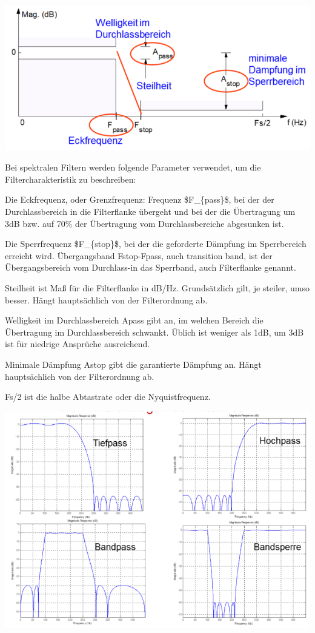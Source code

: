 \documentclass[a4paper]{article}
\begin{document}
\begin{multicols}{3}
  \begin{itemize*}
    \item \includegraphics[width=.5\linewidth]{Assets/Biosignalverarbeitung-Filtertheorie.png}
    \item Bei spektralen Filtern werden folgende Parameter verwendet, um die Filtercharakteristik zu beschreiben:
    \begin{itemize*}
      \item Die Eckfrequenz, oder Grenzfrequenz: Frequenz \$F\_\{pass\}\$, bei der der Durchlassbereich in die Filterflanke übergeht und bei der die Übertragung um 3dB bzw. auf 70\% der Übertragung vom Durchlassbereiche abgesunken ist.
      \item Die Sperrfrequenz \$F\_\{stop\}\$, bei der die geforderte Dämpfung im Sperrbereich erreicht wird. Übergangsband Fstop-Fpass, auch transition band, ist der Übergangsbereich vom Durchlass-in das Sperrband, auch Filterflanke genannt. \item Steilheit ist Maß für die Filterflanke in dB/Hz. Grundsätzlich gilt, je steiler, umso besser. Hängt hauptsächlich von der Filterordnung ab.
      \item Welligkeit im Durchlassbereich Apass gibt an, im welchen Bereich die Übertragung im Durchlassbereich schwankt. Üblich ist weniger als 1dB, um 3dB ist für niedrige Ansprüche ausreichend.
      \item Minimale Dämpfung Astop gibt die garantierte Dämpfung an. Hängt hauptsächlich von der Filterordnung ab.
      \item Fs/2 ist die halbe Abtastrate oder die Nyquistfrequenz.
    \end{itemize*}
    \item \includegraphics[width=.5\linewidth]{Assets/Biosignalverarbeitung-Filtertheorie2.png}

\end{itemize*}
\end{multicols}
\end{document}
